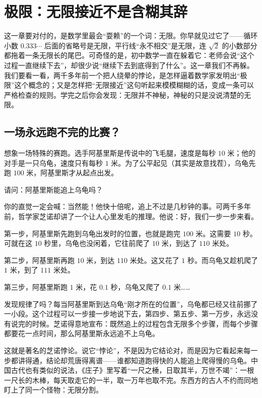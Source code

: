 \chapter{极限：无限接近不是含糊其辞}

这一章要对付的，是数学里最会“耍赖”的一个词：无限。你早就见过它了——循环小数 $0.333\cdots$ 后面的省略号是无限，平行线“永不相交”是无限，连 $\sqrt{2}$ 的小数部分都拖着一条无限长的尾巴。可奇怪的是，初中数学一直在躲着它：老师会说“这个过程一直继续下去”，却很少说“继续下去到底得到了什么”。这一章我们不再躲。我们要看一看，两千多年前一个把人绕晕的悖论，是怎样逼着数学家发明出“极限”这个概念的；又是怎样把“无限接近”这句听起来模模糊糊的话，变成一条可以严格检查的规则。学完之后你会发现：无限并不神秘，神秘的只是没说清楚的无限。

\section{一场永远跑不完的比赛？}

想象一场特殊的赛跑。选手阿基里斯是传说中的飞毛腿，速度是每秒 $10$ 米；他的对手是一只乌龟，速度只有每秒 $1$ 米。为了公平起见（其实是故意找茬），乌龟先跑 $100$ 米，阿基里斯才从起点出发。

请问：阿基里斯能追上乌龟吗？

你的直觉一定会喊：当然能！他快十倍呢，追上不过是几秒钟的事。可两千多年前，哲学家芝诺却讲了一个让人心里发毛的推理。他说：好，我们一步一步来看。

第一步，阿基里斯先跑到乌龟出发时的位置，也就是跑完 $100$ 米。这需要 $10$ 秒。可就在这 $10$ 秒里，乌龟也没闲着，它往前爬了 $10$ 米，到达了 $110$ 米处。

第二步，阿基里斯再跑 $10$ 米，到达 $110$ 米处。这又花了 $1$ 秒。而乌龟又趁机爬了 $1$ 米，到了 $111$ 米处。

第三步，阿基里斯跑 $1$ 米，花 $0.1$ 秒，乌龟又爬了 $0.1$ 米……

发现规律了吗？每当阿基里斯到达乌龟“刚才所在的位置”，乌龟都已经又往前挪了一小段。这个过程可以一步接一步地说下去，第四步、第五步、第一万步，永远没有说完的时候。芝诺得意地宣布：既然追上的过程包含无限多个步骤，而每个步骤都要花一点时间，那么阿基里斯永远追不上乌龟。

这就是著名的芝诺悖论。说它“悖论”，不是因为它结论对，而是因为它看起来每一步都讲得通，结论却荒唐得离谱——谁都知道跑得快的人能追上爬得慢的乌龟。中国古代也有类似的说法，《庄子》里写着“一尺之棰，日取其半，万世不竭”：一根一尺长的木棒，每天取走它的一半，取一万年也取不完。东西方的古人不约而同地盯上了同一个怪物：无限分割。

